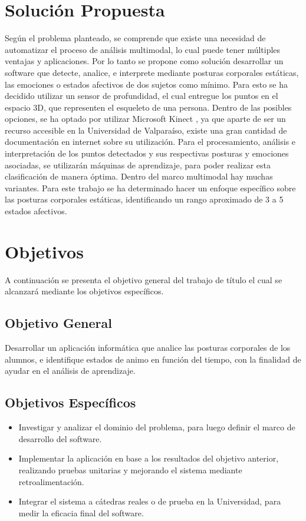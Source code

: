 \section{Soluci\'on Propuesta}
Seg\'un el problema planteado, se comprende que existe una necesidad de automatizar el proceso de an\'alisis multimodal, lo cual puede tener m\'ultiples ventajas y aplicaciones. Por lo tanto se propone como soluci\'on desarrollar un software que detecte, analice, e interprete mediante posturas corporales est\'aticas, las emociones o estados afectivos de dos sujetos como m\'inimo. 
Para esto se ha decidido utilizar un sensor de profundidad, el cual entregue los puntos en el espacio 3D, que representen el esqueleto de una persona. Dentro de las posibles opciones, se ha optado por utilizar Microsoft Kinect \cite{ref14}, ya que aparte de ser un recurso accesible en la Universidad de Valpara\'iso, existe una gran cantidad de documentaci\'on en internet sobre su utilizaci\'on.
Para el procesamiento, an\'alisis e interpretaci\'on de los puntos detectados y sus respectivas posturas y emociones asociadas, se utilizar\'an m\'aquinas de aprendizaje, para poder realizar esta clasificaci\'on de manera \'optima.
Dentro del marco multimodal hay muchas variantes. Para este trabajo se ha determinado hacer un enfoque espec\'ifico sobre las posturas corporales est\'aticas, identificando un rango aproximado de 3 a 5 estados afectivos.


\section{Objetivos}
\label{obj}
A continuaci\'on se presenta el objetivo general del trabajo de t\'itulo el cual se alcanzar\'a mediante los objetivos espec\'ificos.

\subsection{Objetivo General}
Desarrollar un aplicaci\'on inform\'atica que analice las posturas corporales de los alumnos, e identifique estados de animo en funci\'on del tiempo, con la finalidad de ayudar en el an\'alisis de aprendizaje.


\subsection{Objetivos Espec\'ificos}

\begin{itemize}
	\item Investigar y analizar el dominio del problema, para luego definir el marco de desarrollo del software.
	\item Implementar la aplicaci\'on en base a los resultados del objetivo anterior, realizando pruebas unitarias y mejorando el sistema mediante retroalimentaci\'on.
	\item Integrar el sistema a c\'atedras reales o de prueba en la Universidad, para medir la eficacia final del software.
\end{itemize}
